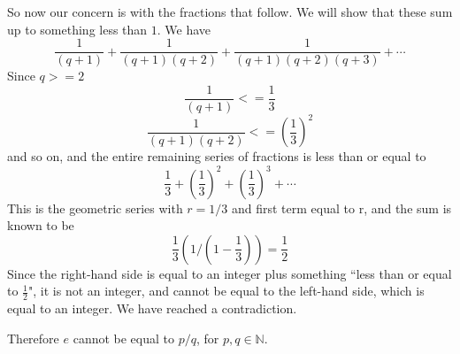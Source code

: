 \documentclass[11pt, oneside]{article}
\begin{document}
So now our concern is with the fractions that follow.  We will show that these sum up to something less than $1$.  We have
\[ \frac{1}{(q+1)} + \frac{1}{(q+1)(q+2)} + \frac{1}{(q+1)(q+2)(q+3)} + \cdots \]
Since $q >= 2$
\[ \frac{1}{(q+1)} <= \frac{1}{3} \]
\[ \frac{1}{(q+1)(q+2)} <= (\frac{1}{3})^2 \]
and so on, and the entire remaining series of fractions is less than or equal to
\[ \frac{1}{3} + (\frac{1}{3})^2 + (\frac{1}{3})^3 + \cdots \]
This is the geometric series with $r = 1/3$ and first term equal to r, and the sum is known to be
\[ \frac{1}{3} ( 1 / (1-\frac{1}{3}) ) = \frac{1}{2} \]
Since the right-hand side is equal to an integer plus something ``less than or equal to $\frac{1}{2}$", it is not an integer, and cannot be equal to the left-hand side, which is equal to an integer.  We have reached a contradiction.  

Therefore $e$ cannot be equal to $p/q$, for $p,q \in \mathbb{N}$.
\end{document}
